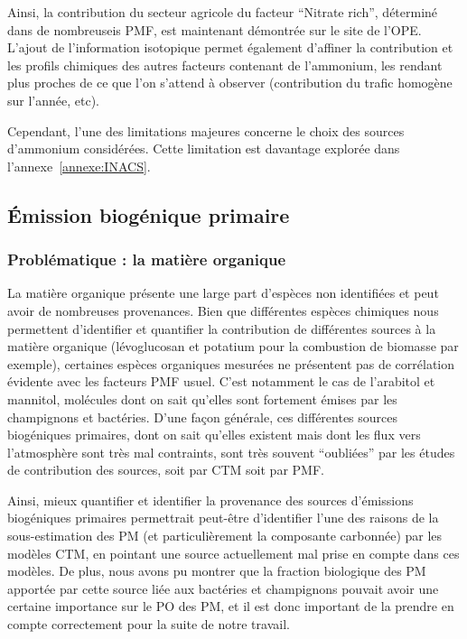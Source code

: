 Ainsi, la contribution du secteur agricole du facteur ``Nitrate rich'', déterminé dans de
nombreuseis PMF, est maintenant démontrée sur le site de l'OPE.
L'ajout de l'information isotopique permet également d'affiner la contribution et les
profils chimiques des autres facteurs contenant de l'ammonium, les rendant plus proches de
ce que l'on s'attend à observer (contribution du trafic homogène sur l'année, etc).

Cependant, l'une des limitations majeures concerne le choix des sources d'ammonium
considérées. Cette limitation est davantage explorée dans l'annexe~\ref{annexe:INACS}.

\subsection{Émission biogénique primaire}%
\label{sub:émission_biogénique_primaire}

\subsubsection{Problématique : la matière organique}%
\label{ssub:problématique_la_matière_organique}

La matière organique présente une large part d'espèces non identifiées et peut avoir de
nombreuses provenances. Bien que différentes espèces chimiques nous
permettent d'identifier et quantifier la contribution de différentes sources à la matière
organique (lévoglucosan et potatium pour la combustion de biomasse par exemple), certaines
espèces organiques mesurées ne présentent pas de corrélation évidente avec les facteurs
PMF usuel. C'est notamment le cas de l'arabitol et mannitol, molécules dont on sait
qu'elles sont fortement émises par les champignons et bactéries.
D'une façon générale, ces différentes sources biogéniques primaires, dont on sait qu'elles
existent mais dont les flux vers l'atmosphère sont très mal contraints, sont très souvent
``oubliées'' par les études de contribution des sources, soit par CTM soit par PMF.

Ainsi, mieux quantifier et identifier la provenance des sources d'émissions biogéniques
primaires permettrait peut-être d'identifier l'une des raisons de la sous-estimation des
PM (et particulièrement la composante carbonnée) par les modèles CTM, en pointant une source actuellement mal prise en compte dans ces
modèles.
De plus, nous avons pu montrer \parencite{samakeUnexpected2017} que la fraction biologique des
PM apportée par cette source liée aux bactéries et champignons pouvait avoir une certaine
importance sur le PO des PM, et il est donc important de la prendre en compte
correctement pour la suite de notre travail.

